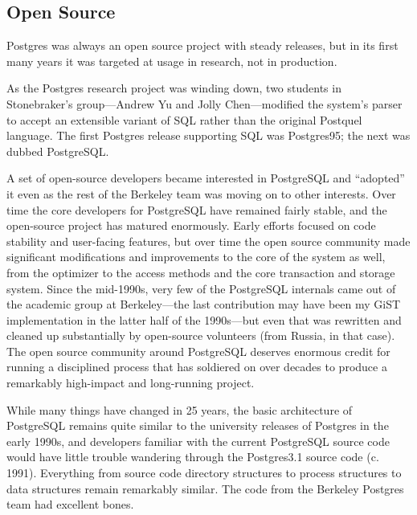 \documentclass[sigconf,natbib=false]{acmart}
\begin{document}
\subsection{Open Source}

Postgres was always an open source project with steady releases, but in its first many years it was targeted at usage in research, not in production.  

As the Postgres research project was winding down, two students in Stonebraker's group---Andrew Yu and Jolly Chen---modified the system's parser to accept an extensible variant of SQL rather than the original Postquel language. The first Postgres release supporting SQL was Postgres95; the next was dubbed PostgreSQL.

A set of open-source developers became interested in PostgreSQL and ``adopted'' it even as the rest of the Berkeley team was moving on to other interests. Over time the core developers for PostgreSQL have remained fairly stable, and the open-source project has matured enormously. Early efforts focused on code stability and user-facing features, but over time the open source community made significant modifications and improvements to the core of the system as well, from the optimizer to the access methods and the core transaction and storage system. Since the mid-1990s, very few of the PostgreSQL internals came out of the academic group at Berkeley---the last contribution may have been my GiST implementation in the latter half of the 1990s---but even that was rewritten and cleaned up substantially by open-source volunteers (from Russia, in that case). The open source community around PostgreSQL deserves enormous credit for running a disciplined process that has soldiered on over decades to produce a remarkably high-impact and long-running project. 

While many things have changed in 25 years, the basic architecture of PostgreSQL remains quite similar to the university releases of Postgres in the early 1990s, and developers familiar with the current PostgreSQL source code would have little trouble wandering through the Postgres3.1 source code (c. 1991). Everything from source code directory structures to process structures to data structures remain remarkably similar. The code from the Berkeley Postgres team had excellent bones.
\end{document}

